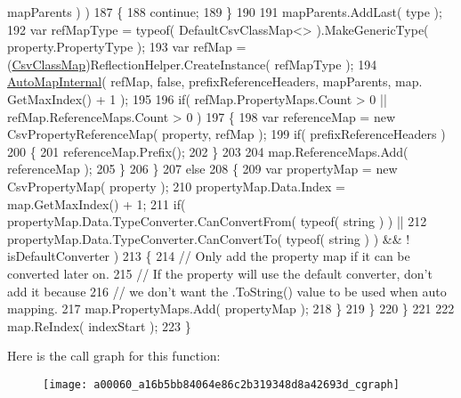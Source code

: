 \begin{DoxyCode}
      mapParents ) )
187                     \{
188                         \textcolor{keywordflow}{continue};
189                     \}
190 
191                     mapParents.AddLast( type );
192                     var refMapType = typeof( DefaultCsvClassMap<> ).MakeGenericType( property.PropertyType 
      );
193                     var refMap = (\hyperlink{a00060_affc5ae8f2b0406d496bcbdf246da6210}{CsvClassMap})ReflectionHelper.CreateInstance( refMapType );
194                     \hyperlink{a00060_a16b5bb84064e86c2b319348d8a42693d}{AutoMapInternal}( refMap, \textcolor{keyword}{false}, prefixReferenceHeaders, mapParents, map.
      GetMaxIndex() + 1 );
195 
196                     \textcolor{keywordflow}{if}( refMap.PropertyMaps.Count > 0 || refMap.ReferenceMaps.Count > 0 )
197                     \{
198                         var referenceMap = \textcolor{keyword}{new} CsvPropertyReferenceMap( property, refMap );
199                         \textcolor{keywordflow}{if}( prefixReferenceHeaders )
200                         \{
201                             referenceMap.Prefix();
202                         \}
203 
204                         map.ReferenceMaps.Add( referenceMap );
205                     \}
206                 \}
207                 \textcolor{keywordflow}{else}
208                 \{
209                     var propertyMap = \textcolor{keyword}{new} CsvPropertyMap( property );
210                     propertyMap.Data.Index = map.GetMaxIndex() + 1;
211                     \textcolor{keywordflow}{if}( propertyMap.Data.TypeConverter.CanConvertFrom( typeof( \textcolor{keywordtype}{string} ) ) ||
212                         propertyMap.Data.TypeConverter.CanConvertTo( typeof( \textcolor{keywordtype}{string} ) ) && !
      isDefaultConverter )
213                     \{
214                         \textcolor{comment}{// Only add the property map if it can be converted later on.}
215                         \textcolor{comment}{// If the property will use the default converter, don't add it because}
216                         \textcolor{comment}{// we don't want the .ToString() value to be used when auto mapping.}
217                         map.PropertyMaps.Add( propertyMap );
218                     \}
219                 \}
220             \}
221 
222             map.ReIndex( indexStart );
223         \}
\end{DoxyCode}


Here is the call graph for this function\-:
\nopagebreak
\begin{figure}[H]
\begin{center}
\leavevmode
\texttt{[image: a00060\_a16b5bb84064e86c2b319348d8a42693d\_cgraph]}
\end{center}
\end{figure}


